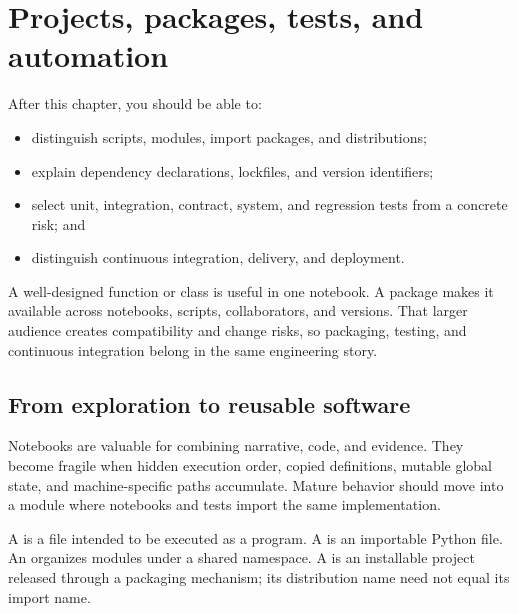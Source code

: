 \chapter{Projects, packages, tests, and automation}
\label{ch:packages-tests}

\begin{learningobjectives}
After this chapter, you should be able to:
\begin{itemize}
  \item distinguish scripts, modules, import packages, and distributions;
  \item explain dependency declarations, lockfiles, and version identifiers;
  \item select unit, integration, contract, system, and regression tests from a
  concrete risk; and
  \item distinguish continuous integration, delivery, and deployment.
\end{itemize}
\end{learningobjectives}

\begin{chapterconnection}
A well-designed function or class is useful in one notebook. A package makes it
available across notebooks, scripts, collaborators, and versions. That larger
audience creates compatibility and change risks, so packaging, testing, and
continuous integration belong in the same engineering story.
\end{chapterconnection}

\section{From exploration to reusable software}

Notebooks are valuable for combining narrative, code, and evidence. They become
fragile when hidden execution order, copied definitions, mutable global state,
and machine-specific paths accumulate. Mature behavior should move into a
module where notebooks and tests import the same implementation.

A  is a file intended to be executed as a program. A
 is an importable Python file. An  organizes
modules under a shared namespace. A  is an installable
project released through a packaging mechanism; its distribution name need not
equal its import name.

\begin{center}
\end{center}

